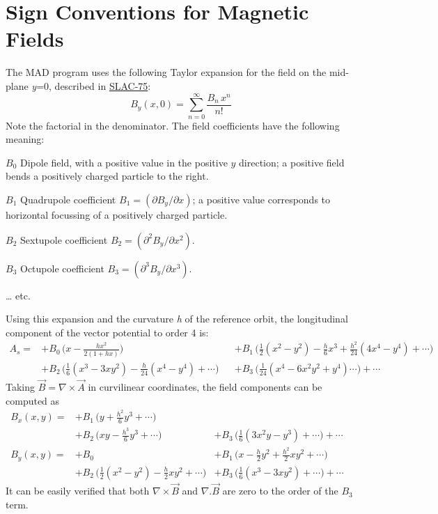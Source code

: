 \section{Sign Conventions for Magnetic Fields}
\label{sec:sign_convention}
The MAD program uses the following Taylor expansion for the field on the
mid-plane \textit{y}=0, described in
\href{bibliography.html#slac75}{SLAC-75}:  
\[
B_{y}(x,0)=\sum_{n=0}^{\infty} \frac{B_n\,x^n}{n!}
\]
Note the factorial in the denominator. 
The field coefficients have the following meaning: 
\begin{madlist}
   \item[$B_0$] 
     Dipole field, with a positive value in the
     positive $y$ direction; a positive field bends a positively
     charged particle to the right.  
   \item[$B_1$] 
     Quadrupole coefficient
     \( B_1 = ( \partial B_y / \partial x ) \);
     a positive value corresponds to horizontal focussing of a
     positively charged particle. 
   \item[$B_2$] 
     Sextupole coefficient
     \( B_2 =  ( \partial^2 B_y / \partial x^2 ) \). 
   \item[$B_3$] 
     Octupole coefficient
     \( B_3 =  ( \partial^3 B_y / \partial x^3 ) \). 
   \item[\ldots] etc.
\end{madlist} 

Using this expansion and the curvature \textit{h} of the reference
orbit, the longitudinal component of the vector potential to order 4 is:  
\[
\begin{aligned}
A_s =  
&+ B_0\,\Big(x-\frac{hx^2}{2(1+hx)}\Big)&
&+ B_1\,\Big(\frac{1}{2}(x^2-y^2) - \frac{h}{6}x^3 + \frac{h^2}{24}(4x^4-y^4)+\cdots\Big) \\
&+ B_2\,\Big(\frac{1}{6}(x^3-3xy^2) - \frac{h}{24}(x^4-y^4)+\cdots \Big)&
&+ B_3\,\Big(\frac{1}{24}(x^4-6x^2y^2+y^4) \cdots \Big)+\cdots
\end{aligned}
\]
Taking \(\vec{B} = \nabla \times \vec{A}\) in curvilinear coordinates,
the field components can be computed as  
\[
\begin{aligned}
B_x(x,y) =
&+ B_1\,\Big(y+\frac{h^2}{6}y^3+\cdots\Big)&  &  \\
&+ B_2\,\Big(xy - \frac{h^3}{6}y^3+\cdots \Big)&+B_3\,\Big(\frac{1}{6}(3x^2y-y^3)+ \cdots \Big)+\cdots\\
B_y(x,y)=
&+ B_0 & + B_1\,\Big(x-\frac{h}{2}y^2+\frac{h^2}{2}xy^2+\cdots \Big)\\
&+ B_2\,\Big(\frac{1}{2}(x^2-y^2)-\frac{h}{2}xy^2+\cdots \Big) & + B_3\,\Big(\frac{1}{6}(x^3-3xy^2)+ \cdots \Big)+\cdots
\end{aligned}
\]
It can be easily verified that both \(\nabla \times \vec{\textit{B}}\)
and \(\nabla . \vec{\textit{B}}\) are zero to the order of the
\(\textit{B}_3\) term.  

